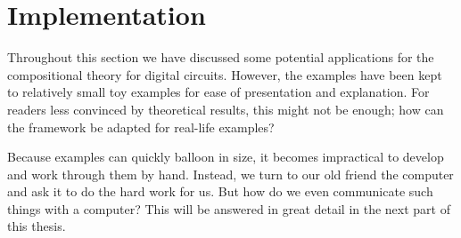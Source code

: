\section{Implementation}

Throughout this section we have discussed some potential applications for the
compositional theory for digital circuits.
However, the examples have been kept to relatively small toy examples for
ease of presentation and explanation.
For readers less convinced by theoretical results, this might not be enough; how
can the framework be adapted for real-life examples?

Because examples can quickly balloon in size, it becomes impractical to develop
and work through them by hand.
Instead, we turn to our old friend the computer and ask it to do the hard work
for us.
But how do we even communicate such things with a computer?
This will be answered in great detail in the next part of this thesis.

